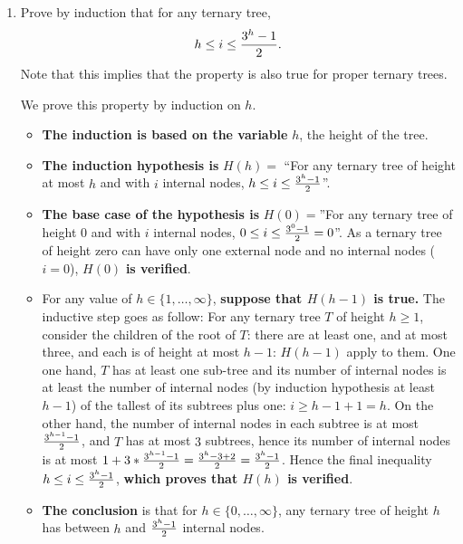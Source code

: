 \begin{enumerate}

\item Prove by induction that for any ternary tree,
%
$$h\leq i \leq {3^h-1\over 2}.$$
%
Note that this implies that the property is also true for proper
ternary trees.
\begin{solution}

We prove this property by induction on $h$.
\begin{itemize}

\item {\bf The induction is based on the variable} $h$, the height of
the tree.

\item {\bf The induction hypothesis is} $H(h)=$ ``For any
ternary tree of height at most $h$ and with $i$ internal nodes,
%
$h\leq i \leq {3^h-1\over2}$''.

\item {\bf The base case of the hypothesis is} $H(0)=$''For any
ternary tree of height $0$ and with $i$ internal nodes,
$0\leq{i}\leq {3^0-1\over2}=0$''.
%
As a ternary tree of height zero can have only one external node and
no internal nodes ($i=0$), $H(0)$ {\bf is verified}.

\item For any value of $h\in\{1,\ldots,\infty\}$, {\bf suppose that
$H(h-1)$ is true.}  The inductive step goes as follow:
%
For any ternary tree $T$ of height $h\geq1$, consider the children of
the root of $T$: there are at least one, and at most three, and each
is of height at most $h-1$: $H(h-1)$ apply to them.
%
One one hand, $T$ has at least one sub-tree and its number of internal
nodes is at least the number of internal nodes (by induction
hypothesis at least $h-1$) of the tallest of its subtrees plus one:
$i\geq h-1+1=h$.
%
On the other hand, the number of internal nodes in each subtree is at
most ${3^{h-1}-1\over 2}$, and $T$ has at most $3$ subtrees, hence its
number of internal nodes is at most
$1+3*{3^{h-1}-1\over 2}
= {3^h-3+2\over2}
= {3^h-1\over2}$.
%
Hence the final inequality $h\leq i \leq {3^{h}-1\over 2}$, {\bf which
proves that $H(h)$ is verified}.

\item {\bf The conclusion} is that for $h\in\{0,\ldots,\infty\}$, any
ternary tree of height $h$ has between $h$ and ${3^h-1}\over2$ internal nodes.


\end{itemize}
\end{solution}
\end{enumerate}
